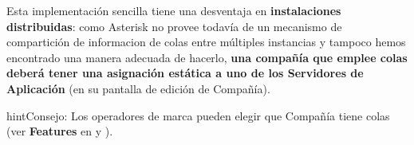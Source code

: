 \documentclass[letterpaper,10pt,spanish]{sphinxmanual}
\begin{document}
Esta implementación sencilla tiene una desventaja en \textbf{instalaciones distribuidas}: como Asterisk no provee todavía de un mecanismo de compartición de informacion de colas entre múltiples instancias y tampoco hemos encontrado una manera adecuada de hacerlo, \textbf{una compañía que emplee colas deberá tener una asignación estática a uno de los Servidores de Aplicación} (en su pantalla de edición de Compañía).

\begin{notice}{hint}{Consejo:}
Los operadores de marca pueden elegir que Compañía tiene colas (ver \textbf{Features} en {\hyperref[internal_calls/brand_portal:brand\string-configuration]{}} y {\hyperref[internal_calls/company_portal:company\string-configuration]{}}).
\end{notice}
\end{document}
